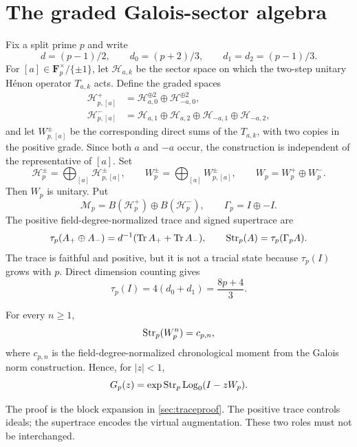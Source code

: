 \section{The graded Galois-sector algebra}

Fix a split prime $p$ and write
\[
 d=(p-1)/2,\qquad d_0=(p+2)/3,\qquad d_1=d_2=(p-1)/3.
\]
For $[a]\in\mathbf F_p^\times/\{\pm1\}$, let $\mathcal H_{a,k}$ be the
sector space on which the two-step unitary H\'enon operator $T_{a,k}$ acts.
Define the graded spaces
\begin{align*}
 \mathcal H_{p,[a]}^+
 &=\mathcal H_{a,0}^{\oplus2}\oplus\mathcal H_{-a,0}^{\oplus2},\\
 \mathcal H_{p,[a]}^-
 &=\mathcal H_{a,1}\oplus\mathcal H_{a,2}
   \oplus\mathcal H_{-a,1}\oplus\mathcal H_{-a,2},
\end{align*}
and let $W_{p,[a]}^\pm$ be the corresponding direct sums of the $T_{a,k}$,
with two copies in the positive grade.  Since both $a$ and $-a$ occur, the
construction is independent of the representative of $[a]$.  Set
\[
 \mathcal H_p^\pm=\bigoplus_{[a]}\mathcal H_{p,[a]}^\pm,
 \qquad
 W_p^\pm=\bigoplus_{[a]}W_{p,[a]}^\pm,
 \qquad W_p=W_p^+\oplus W_p^-.
\]
Then $W_p$ is unitary.  Put
\[
 \mathcal M_p=B(\mathcal H_p^+)\oplus B(\mathcal H_p^-),
 \qquad \Gamma_p=I\oplus-I.
\]
The positive field-degree-normalized trace and signed supertrace are
\[
 \tau_p(A_+\oplus A_-)=d^{-1}(\operatorname{Tr} A_++\operatorname{Tr} A_-),
 \qquad
 \operatorname{Str}_p(A)=\tau_p(\Gamma_pA).
\]
The trace is faithful and positive, but it is not a tracial state because
$\tau_p(I)$ grows with $p$.
Direct dimension counting gives
\begin{equation}\label{eq:dimension}
 \tau_p(I)=4(d_0+d_1)=\frac{8p+4}{3}.
\end{equation}

\begin{proposition}\label{prop:moment}
For every $n\ge1$,
\[
 \operatorname{Str}_p(W_p^n)=c_{p,n},
\]
where $c_{p,n}$ is the field-degree-normalized chronological moment from the
Galois norm construction.  Hence, for $|z|<1$,
\[
 G_p(z)=\exp\operatorname{Str}_p\operatorname{Log}_0(I-zW_p).
\]
\end{proposition}

The proof is the block expansion in \cref{sec:traceproof}.  The positive trace
controls ideals; the supertrace encodes the virtual augmentation.  These two
roles must not be interchanged.

